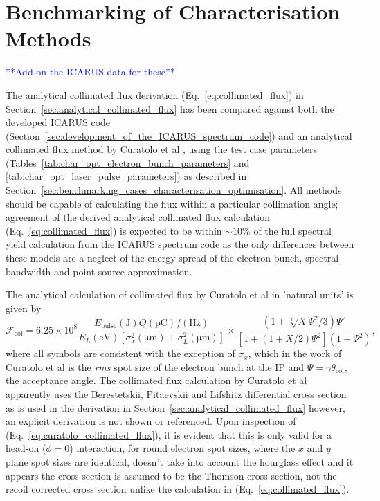 \documentclass[../main.tex]{subfiles}
\begin{document}
\section{Benchmarking of Characterisation Methods}
\label{sec:benchmarking_of_the_ICARUS_spectrum_code}

\textcolor{blue}{ **Add on the ICARUS data for these** }

The analytical collimated flux derivation (Eq.~\ref{eq:collimated_flux}) in Section~\ref{sec:analytical_collimated_flux} has been compared against both the developed \textsc{ICARUS} code (Section~\ref{sec:development_of_the_ICARUS_spectrum_code}) and an analytical collimated flux method by Curatolo et al \cite{curatolo2017analytical}, using the test case parameters (Tables~\ref{tab:char_opt_electron_bunch_parameters} and \ref{tab:char_opt_laser_pulse_parameters}) as described in Section~\ref{sec:benchmarking_cases_characterisation_optimisation}. All methods should be capable of calculating the flux within a particular collimation angle; agreement of the derived analytical collimated flux calculation (Eq.~\ref{eq:collimated_flux}) is expected to be within $\sim10$\% of the full spectral yield calculation from the \textsc{ICARUS} spectrum code as the only differences between these models are a neglect of the energy spread of the electron bunch, spectral bandwidth and point source approximation. 

The analytical calculation of collimated flux by Curatolo et al \cite{curatolo2017analytical} in 'natural units' is given by  
\begin{equation}
\mathcal{F}_{\mathrm{col}} = 6.25\times 10^{8}\frac{E_{\mathrm{pulse}}\left(\mathrm{\si{\joule}}\right)Q\left(\si{\pico\coulomb}\right)f\left(\si{\hertz}\right)}{E_{L}\left(\si{\electronvolt}\right)\left[\sigma_{x}^{2}\left(\si{\micro\meter}\right)+\sigma_{L}^{2}\left(\si{\micro\meter}\right)\right]}\times\frac{\left(1+\sqrt[3]{X}\Psi^{2}/3\right)\Psi^{2}}{\left[1+\left(1+X/2\right)\Psi^{2}\right]\left(1+\Psi^{2}\right)},
\label{eq:curatolo_collimated_flux}
\end{equation}
where all symbols are consistent with the exception of $\sigma_{x}$, which in the work of Curatolo et al is the \textit{rms} spot size of the electron bunch at the IP and $\Psi = \gamma\theta_{\mathrm{col}}$, the acceptance angle. The collimated flux calculation by Curatolo et al \cite{curatolo2017analytical} apparently uses the Berestetskii, Pitaevskii and Lifshitz \cite{berestetskii1982quantum} differential cross section as is used in the derivation in Section~\ref{sec:analytical_collimated_flux} however, an explicit derivation is not shown or referenced. Upon inspection of (Eq.~\ref{eq:curatolo_collimated_flux}), it is evident that this is only valid for a head-on ($\phi=0$) interaction, for round electron spot sizes, where the $x$ and $y$ plane spot sizes are identical, doesn't take into account the hourglass effect \cite{furman1991hourglass,miyahara2008luminosity} and it appears the cross section is assumed to be the Thomson cross section, not the recoil corrected cross section unlike the calculation in (Eq.~\ref{eq:collimated_flux}).   
\end{document}
